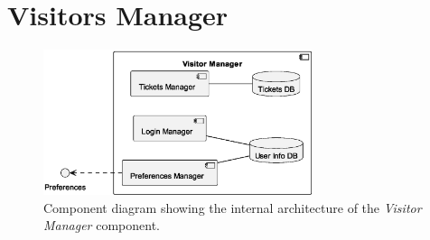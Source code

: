 \section{Visitors Manager}

\begin{figure}[H]
	\centering
	\includegraphics[width=0.7\textwidth]{img/visitor-manager.eps}
	\caption{Component diagram showing the internal architecture of the \textit{Visitor Manager} component.
	}
	\label{fig:visitor-manager-arch}
\end{figure}
